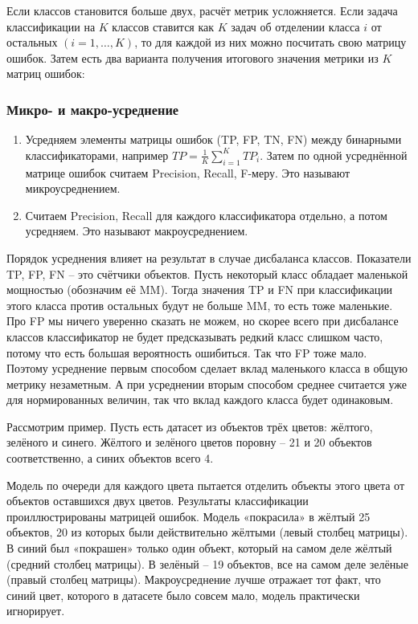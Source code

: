 Если классов становится больше двух, расчёт метрик усложняется.
Если задача классификации на $K$ классов ставится как $K$ задач об отделении класса $i$ от остальных
$(i=1, \dots, K)$, то для каждой из них можно посчитать свою матрицу ошибок.
Затем есть два варианта получения итогового значения метрики из $K$ матриц ошибок:

\subsubsection{Микро- и макро-усреднение}

\begin{enumerate}
    \item Усредняем элементы матрицы ошибок (TP, FP, TN, FN) между бинарными классификаторами, например
    $TP = \frac{1}{K} \sum_{i=1}^K TP_i$.
    Затем по одной усреднённой матрице ошибок считаем Precision, Recall, F-меру.
    Это называют микроусреднением.
    \item Считаем Precision, Recall для каждого классификатора отдельно, а потом усредняем.
    Это называют макроусреднением.
\end{enumerate}
Порядок усреднения влияет на результат в случае дисбаланса классов.
Показатели TP, FP, FN -- это счётчики объектов.
Пусть некоторый класс обладает маленькой мощностью (обозначим её MM).
Тогда значения TP и FN при классификации этого класса против остальных будут не больше MM, то есть тоже маленькие.
Про FP мы ничего уверенно сказать не можем, но скорее всего при дисбалансе классов классификатор не будет
предсказывать редкий класс слишком часто, потому что есть большая вероятность ошибиться.
Так что FP тоже мало.
Поэтому усреднение первым способом сделает вклад маленького класса в общую метрику незаметным.
А при усреднении вторым способом среднее считается уже для нормированных величин, так что вклад каждого класса будет
одинаковым.

Рассмотрим пример.
Пусть есть датасет из объектов трёх цветов: жёлтого, зелёного и синего.
Жёлтого и зелёного цветов поровну -- 21 и 20 объектов соответственно, а синих объектов всего 4.

Модель по очереди для каждого цвета пытается отделить объекты этого цвета от объектов оставшихся двух цветов.
Результаты классификации проиллюстрированы матрицей ошибок.
Модель «покрасила» в жёлтый 25 объектов, 20 из которых были действительно жёлтыми (левый столбец матрицы).
В синий был «покрашен» только один объект, который на самом деле жёлтый (средний столбец матрицы).
В зелёный -- 19 объектов, все на самом деле зелёные (правый столбец матрицы).
Макроусреднение лучше отражает тот факт, что синий цвет, которого в датасете было совсем мало, модель практически
игнорирует.
